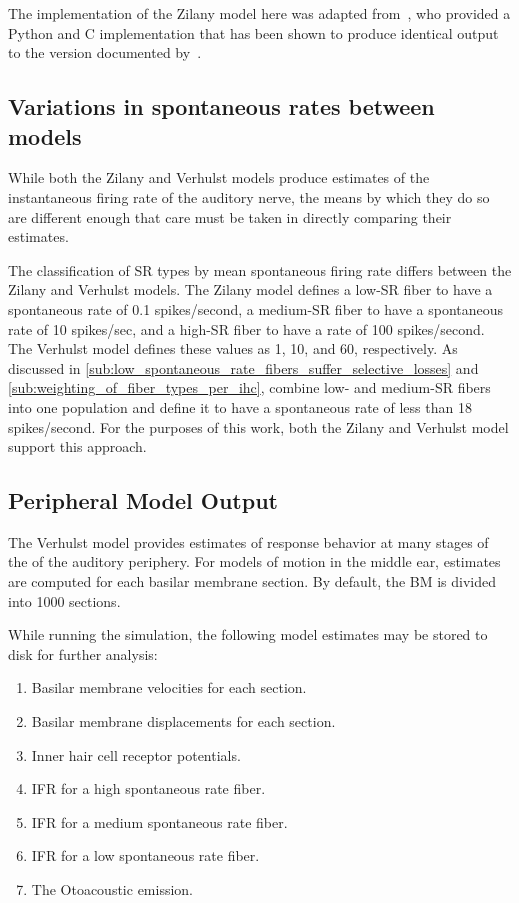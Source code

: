 The implementation of the Zilany model here was adapted from~\cite{Rudnicki2014Cochlea}, who provided a Python and C implementation that has been shown to produce identical output to the version documented by~\cite{Zilany2014Updated}.

\subsection{Variations in spontaneous rates between models} %
\label{sub:interoperability_of_the_zilany_and_verhulst_models}
While both the Zilany and Verhulst models produce estimates of the instantaneous firing rate of the auditory nerve, the means by which they do so are different enough that care must be taken in directly comparing their estimates.  

The classification of SR types by mean spontaneous firing rate differs between the Zilany and Verhulst models.  The Zilany model defines a low-SR fiber to have a spontaneous rate of 0.1 spikes/second, a medium-SR fiber to have a spontaneous rate of 10 spikes/sec, and a high-SR fiber to have a rate of 100 spikes/second.  The Verhulst model defines these values as 1, 10, and 60, respectively.  As discussed in \autoref{sub:low_spontaneous_rate_fibers_suffer_selective_losses} and \autoref{sub:weighting_of_fiber_types_per_ihc}, \citeauthor{Temchin2008Threshold} combine low- and medium-SR fibers into one population and define it to have a spontaneous rate of less than 18 spikes/second.  For the purposes of this work, both the Zilany and Verhulst model support this approach.


\subsection{Peripheral Model Output} %
\label{sub:peripheral_model_output}
The Verhulst model provides estimates of response behavior at many stages of the of the auditory periphery.   For models of motion in the middle ear, estimates are computed for each basilar membrane section.  By default, the BM is divided into 1000 sections. 

 While running the simulation, the following model estimates may be stored to disk for further analysis: 
\begin{enumerate}
	\item Basilar membrane velocities for each section.
	\item Basilar membrane displacements for each section.
	\item Inner hair cell receptor potentials. 
	\item IFR for a high spontaneous rate fiber.
	\item IFR for a medium spontaneous rate fiber.
	\item IFR for a low spontaneous rate fiber. 
	\item The Otoacoustic emission. 
\end{enumerate}

